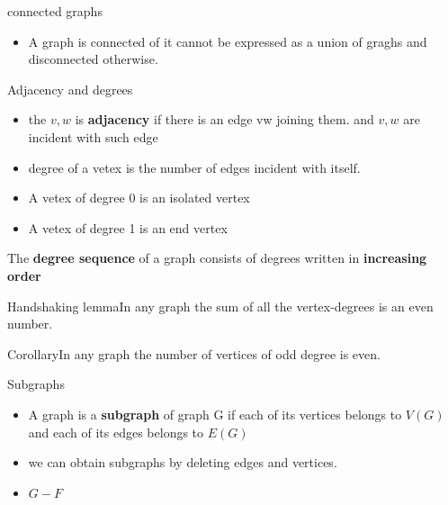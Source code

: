 \documentclass[12pt,a4paper]{ctexart}
\begin{document}
\begin{center}
    \colorbox{mygrey}{\color{myred}connected graphs}
    \begin{itemize}
        \item A graph is connected of it cannot be expressed as a union of graghs and disconnected otherwise.
    \end{itemize}
\end{center}

\begin{center}
    \colorbox{mygrey}{\color{myred}Adjacency and degrees}
    \begin{itemize}
        \item the $v,w$ is \textbf{adjacency} if there is an edge vw joining them. and $v,w$ are incident with such edge
        \item degree of a vetex is the number of edges incident with itself.
        \item A vetex of degree 0 is an isolated vertex 
        \item A vetex of degree 1 is an end vertex 
    \end{itemize}
\end{center}
The \textbf{degree sequence} of a graph consists of degrees written in \textbf{increasing order}

\begin{center}
    \colorbox{mygrey}{\color{myred}Handshaking lemma}\colorbox{mygrey}{In any graph the sum of all the vertex-degrees}
    \colorbox{mygrey}{is an even number.~~~~~~~~~~~~~~~~~~~~~~~~~~~~~~~~~~~~~~~~~~~~~~~~~~~~~~~~~~~~~~~}
\end{center}
\colorbox{mygrey}{\color{myred}Corollary}\colorbox{mygrey}{In any graph the number of vertices of odd degree is even.}
\begin{center}
    \colorbox{mygrey}{\color{myred}Subgraphs}
    \begin{itemize}
        \item A graph is a \textbf{subgraph} of graph G if each of its vertices belongs to $V(G)$ and each of its edges belongs to $E(G)$
        \item we can obtain subgraphs by deleting edges and vertices.
        \item $G-F$
    \end{itemize}
\end{center}
\end{document}
